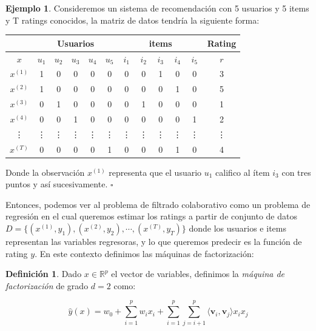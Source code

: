 \documentclass[hidelinks,12pt,a4paper]{book}
\providecommand{\prodint}[1]{\langle#1\rangle}
\theoremstyle{plain}
\theoremstyle{definition}
\newtheorem{definicion}[theorem]{Definición} %
\newtheorem{ejemplo}{{\textbf{Ejemplo}}}[chapter]
\begin{document}
\begin{ejemplo}
Consideremos un sistema de recomendación con 5 usuarios y 5 items y T ratings conocidos, la matriz de datos tendría la siguiente forma:\\

\begin{table}[h]
\centering
\begin{tabular}{|c|c c c c c|c c c c c|c|}
\hline
 & \multicolumn{5}{|c|}{Usuarios} & \multicolumn{5}{|c|}{items} & Rating \\
\hline
$x$ & $u_1$ & $u_2$ & $u_3$ & $u_4$ & $u_5$ & $i_1$ & $i_2$ & $i_3$ & $i_4$ & $i_5$ & $r$ \\ 
\hline
$x^{(1)}$ & 1 & 0 & 0 & 0 & 0 & 0 & 0 & 1 & 0 & 0 & 3 \\
$x^{(2)}$ & 1 & 0 & 0 & 0 & 0 & 0 & 0 & 0 & 1 & 0 & 5 \\
$x^{(3)}$ & 0 & 1 & 0 & 0 & 0 & 0 & 1 & 0 & 0 & 0 & 1 \\
$x^{(4)}$ & 0 & 0 & 1 & 0 & 0 & 0 & 0 & 0 & 0 & 1 & 2 \\
\vdots & \vdots & \vdots & \vdots & \vdots & \vdots & \vdots & \vdots & \vdots & \vdots & \vdots & \vdots\\
$x^{(T)}$ & 0 & 0 & 0 & 0 & 1 & 0 & 0 & 0 & 1 & 0 & 4 \\
\hline
\end{tabular}
\end{table}
Donde la observación $x^{(1)}$ representa que el usuario $u_1$ califico al ítem $i_3$ con tres puntos y así sucesivamente. \hfill$\square$
\end{ejemplo}

Entonces, podemos ver al problema de filtrado colaborativo como un problema de regresión en el cual queremos estimar los ratings  a partir de conjunto de datos $D=\{(x^{(1)},y_1),(x^{(2)},y_2), \cdots, (x^{(T)},y_T)\}$ donde los usuarios e items representan las variables regresoras, y lo que queremos predecir es la función de rating $y$. En este contexto definimos las máquinas de factorización:

\begin{definicion}
\label{def:fm1}
Dado $x\in \mathbb{R}^{p}$ el vector de variables, definimos la \textit{máquina de factorización} de grado $d=2$ como:

\begin{equation}
\label{fm-orden2}
\hat{y}(x)=w_0+\sum_{i=1}^p w_i x_i + \sum_{i=1}^p \sum_{j=i+1}^p \prodint{\mathbf{v}_i,\mathbf{v}_j} x_i x_j
\end{equation}
\end{definicion}
\end{document}
